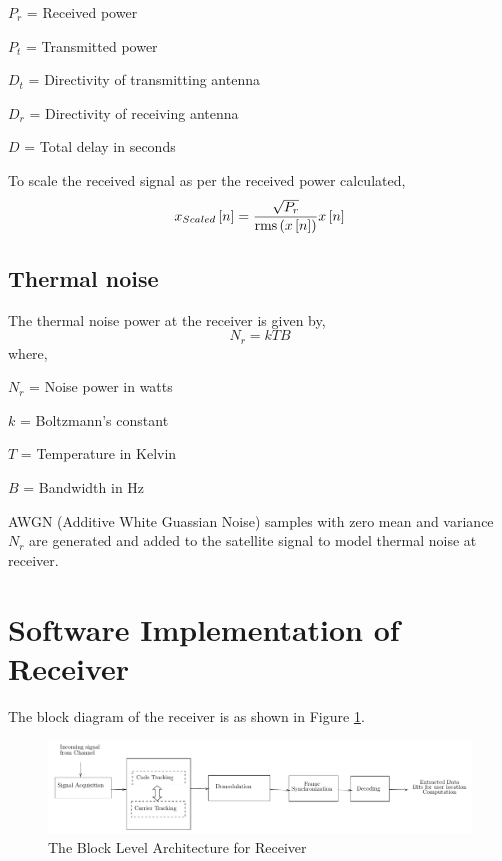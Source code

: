 \documentclass[conference]{IEEEtran}
\begin{document}
$P_r$ = Received power

$P_t$ = Transmitted power

$D_t$ = Directivity of transmitting antenna 

$D_r$ = Directivity of receiving antenna 

$D$ = Total delay in seconds

To scale the received signal as per the received power calculated,
\begin{equation}
    x_{Scaled}{}\left[n\right] = \frac{\sqrt{P_r}}{\operatorname{rms}\left(x{}\left[n\right]\right)}x{}\left[n\right]
\end{equation}   

\subsection{Thermal noise}
The thermal noise power at the receiver is given by,
\begin{equation}
    N_r = k T B
\end{equation}
where,

$N_r$ = Noise power in watts

$k$ = Boltzmann's constant

$T$ = Temperature in Kelvin

$B$ = Bandwidth in Hz

AWGN (Additive White Guassian Noise) samples with zero mean and variance $N_r$ are generated and added to the satellite signal to model thermal noise at receiver.

\section{Software Implementation of Receiver}
The block diagram of the receiver is as shown in Figure \ref{fig:demod_flow}.
\begin{normalsize}
	\begin{figure}[ht]
		\centering
		\includegraphics[width=1\columnwidth]{figs/receiver_block}
		\centering
		\caption{The Block Level Architecture for Receiver}
		\label{fig:demod_flow}
	\end{figure}
\end{normalsize}
\end{document}
